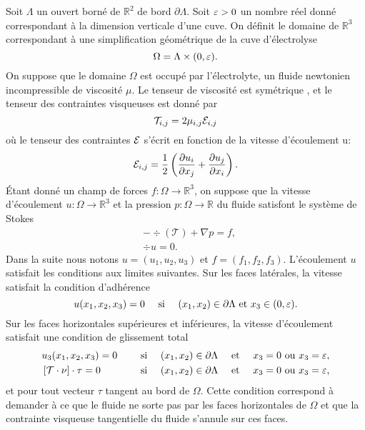 Soit $\Lambda$ un ouvert borné de $\mathbb R^2$ de bord
$\partial\Lambda$. Soit $\varepsilon > 0$ un nombre réel donné
correspondant à la dimension verticale d'une cuve. On définit le
domaine de $\mathbb R^3$ correspondant à une simplification
géométrique de la cuve d'électrolyse
\begin{equation}
  \Omega = \Lambda \times (0,\varepsilon).
\end{equation}
On suppose que le domaine $\Omega$ est occupé par l'électrolyte, un
fluide newtonien incompressible de viscosité $\mu$. Le tenseur de
viscosité est symétrique \cite{Landau1987}, et le tenseur des
contraintes visqueuses est donné par
\begin{equation}
  \mathcal T_{i,j} = 2\mu_{i,j} \mathcal E_{i,j}
\end{equation}
où le tenseur des contraintes $\mathcal E$ s'écrit en fonction de
la vitesse d'écoulement u:
\begin{equation}
  \mathcal E_{i,j} = \frac{1}{2}\left( \frac{\partial u_i}{\partial x_j} + \frac{\partial u_j}{\partial x_i} \right).
\end{equation}
Étant donné un champ de forces $f:\Omega\to \mathbb R^3$, on suppose
que la vitesse d'écoulement $u:\Omega \to \mathbb R^3$ et la pression
$p:\Omega \to \mathbb R$ du fluide satisfont le système de Stokes
\begin{align}
  &- \div(\mathcal T) + \nabla p = f,\label{eq:stokes-u}\\
  &\div u = 0.\label{eq:stokes-p}
\end{align}
Dans la suite nous notons $u = (u_1, u_2, u_3)$ et $f = (f_1, f_2,
f_3)$. L'écoulement $u$ satisfait les conditions aux limites suivantes.
Sur les faces latérales, la vitesse satisfait la condition
d'adhérence
\begin{equation}
  u(x_1, x_2, x_3) = 0\quad \text{ si }\quad (x_1, x_2) \in \partial \Lambda%
  \text{ et } x_3\in(0, \thickness).\label{eq:stokes-bc-1}
\end{equation}
Sur les faces horizontales supérieures et inférieures, la vitesse
d'écoulement satisfait une condition de glissement total
\begin{align}
  &u_3(x_1, x_2, x_3) = 0&\quad \text{ si }\quad (x_1, x_2) \in \partial \Lambda%
  \quad\text{ et }\quad x_3 = 0 \text{ ou } x_3 = \thickness,\\
  &\left[ \mathcal T\cdot \nu \right]\cdot\tau = 0&\quad \text{ si }\quad (x_1, x_2) \in \partial \Lambda%
  \quad\text{ et }\quad x_3 = 0 \text{ ou } x_3 = \thickness,
\end{align}
et pour tout vecteur $\tau$ tangent au bord de $\Omega$. Cette
condition correspond à demander à ce que le fluide ne sorte pas par les
faces horizontales de $\Omega$ et que la contrainte visqueuse tangentielle du
fluide s'annule sur ces faces.

